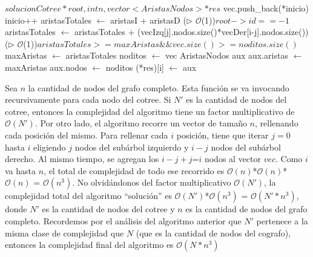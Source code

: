 \begin{algoritmo}{$solucion$}{$Cotree* root, int n, vector<AristasNodos>* res$}{}
{{{{{                      vec.push\_back(*inicio) 
                      inicio++ 
                    }
                }
                aristasTotales $\gets$ aristasI + aristasD 
                \If(\hfill {$\triangleright$ $\mathcal{O}$(1)}){$root->id == -1$} {
                	aristasTotales $\gets$ aristasTotales + (vecIzq[j].nodos.size()*vecDer[i-j].nodos.size()) 
                }
                \If(\hfill {$\triangleright$ $\mathcal{O}$(1)}){$aristasTotales >= maxAristas \&\& vec.size() >= noditos.size()$} {
                	maxAristas $\gets$ aristasTotales 
          			noditos $\gets$ vec 
                }
            }
            AristasNodos aux 
            aux.aristas $\gets$ maxAristas 
            aux.nodos $\gets$ noditos 
            (*res)[i] $\gets$ aux 
        }
    }
\end{algoritmo}
\normalsize{}
Sea $n$ la cantidad de nodos del grafo completo. Esta función se va invocando recursivamente para cada nodo del cotree. Si $N'$ es la cantidad de nodos del cotree, entonces la complejidad del algoritmo tiene un factor multiplicativo de $\mathcal{O}(N')$. Por otro lado, el algoritmo recorre un vector de tamaño $n$, rellenando cada posición del mismo. Para rellenar cada $i$ posición, tiene que iterar $j=0$ hasta $i$ eligiendo $j$ nodos del subárbol izquierdo y $i-j$ nodos del subárbol derecho. Al mismo tiempo, se agregan los $i-j+j$=$i$ nodos al vector $vec$. Como $i$ va hasta $n$, el total de complejidad de todo ese recorrido es $\mathcal{O}(n)$*$\mathcal{O}(n)$*$\mathcal{O}(n)$ = $\mathcal{O}(n^3)$. No olvidándonos del factor multiplicativo $\mathcal{O}(N')$, la complejidad total del algoritmo ``solución'' es $\mathcal{O}(N')$*$\mathcal{O}(n^3)$ = $\mathcal{O}(N'*n^3)$, donde $N'$ es la cantidad de nodos del cotree y $n$ es la cantidad de nodos del grafo completo. Recordemos por el análisis del algoritmo anterior que $N'$ pertenece a la misma clase de complejidad que $N$ (que es la cantidad de nodos del cografo), entonces la complejidad final del algoritmo es $\mathcal{O}(N*n^3)$ \\

